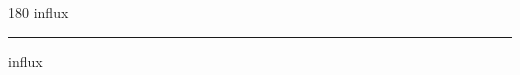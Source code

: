 
\begin{frame}
\begin{center}
\begin{turn}{180}
{\fontsize{2.5cm}{1em}\selectfont influx}
\end{turn}
\vspace{1em}\par  
\hrule
\vspace{1em}\par  
{\fontsize{2.5cm}{1em}\selectfont influx}
\end{center}
\end{frame}
